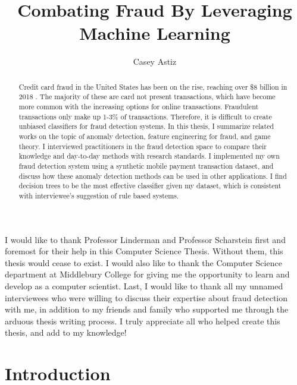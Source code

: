 \documentclass[midd]{thesis}
\title {Combating Fraud By Leveraging Machine Learning}
\author {Casey Astiz}
\begin{document}
\maketitle
{}

\begin{abstract}

Credit card fraud in the United States has been on the rise, reaching over \$8 billion in 2018 \cite{USA}. The majority of these are card not present transactions, which have become more common with the increasing options for online transactions. Fraudulent transactions only make up 1-3\% of transactions. Therefore, it is difficult to create unbiased classifiers for fraud detection systems. In this thesis, I summarize related works on the topic of anomaly detection, feature engineering for fraud, and game theory. I interviewed practitioners in the fraud detection space to compare their knowledge and day-to-day methods with research standards. I implemented my own fraud detection system using a synthetic mobile payment transaction dataset, and discuss how these anomaly detection methods can be used in other applications. I find decision trees to be the most effective classifier given my dataset, which is consistent with interviewee's suggestion of rule based systems.

\end{abstract}



\begin{acknowledgements}
I would like to thank Professor Linderman and Professor Scharstein first and foremost for their help in this Computer Science Thesis. Without them, this thesis would cease to exist. I would also like to thank the Computer Science department at Middlebury College for giving me the opportunity to learn and develop as a computer scientist. Last, I would like to thank all my unnamed interviewees who were willing to discuss their expertise about fraud detection with me, in addition to my friends and family who supported me through the arduous thesis writing process. I truly appreciate all who helped create this thesis, and add to my knowledge!

\end{acknowledgements}

\contentspage
\tablelistpage   
\figurelistpage

\normalspacing \setcounter{page}{1} 

\chapter{Introduction}
\label{sec:intro}
\end{document}

